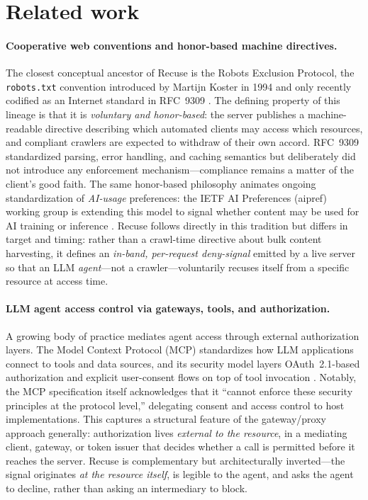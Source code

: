 \section{Related work}
\label{sec:related}

\paragraph{Cooperative web conventions and honor-based machine directives.}
The closest conceptual ancestor of Recuse is the Robots Exclusion Protocol, the
\texttt{robots.txt} convention introduced by Martijn Koster in 1994 and only
recently codified as an Internet standard in RFC~9309
\citep{rfc9309}. The defining property of this lineage is that it is
\emph{voluntary and honor-based}: the server publishes a machine-readable
directive describing which automated clients may access which resources, and
compliant crawlers are expected to withdraw of their own accord. RFC~9309
standardized parsing, error handling, and caching semantics but deliberately did
not introduce any enforcement mechanism---compliance remains a matter of the
client's good faith. The same honor-based philosophy animates ongoing
standardization of \emph{AI-usage} preferences: the IETF AI Preferences (aipref)
working group is extending this model to signal whether content may be used for
AI training or inference \citep{aipref-attach}. Recuse follows directly in this
tradition but differs in target and timing: rather than a crawl-time directive
about bulk content harvesting, it defines an \emph{in-band, per-request
deny-signal} emitted by a live server so that an LLM \emph{agent}---not a
crawler---voluntarily recuses itself from a specific resource at access time.

\paragraph{LLM agent access control via gateways, tools, and authorization.}
A growing body of practice mediates agent access through external authorization
layers. The Model Context Protocol (MCP) standardizes how LLM applications
connect to tools and data sources, and its security model layers OAuth~2.1-based
authorization and explicit user-consent flows on top of tool invocation
\citep{mcp2025}. Notably, the MCP specification itself acknowledges that it
``cannot enforce these security principles at the protocol level,'' delegating
consent and access control to host implementations. This captures a structural
feature of the gateway/proxy approach generally: authorization lives
\emph{external to the resource}, in a mediating client, gateway, or token issuer
that decides whether a call is permitted before it reaches the server. Recuse is
complementary but architecturally inverted---the signal originates \emph{at the
resource itself}, is legible to the agent, and asks the agent to decline, rather
than asking an intermediary to block.

